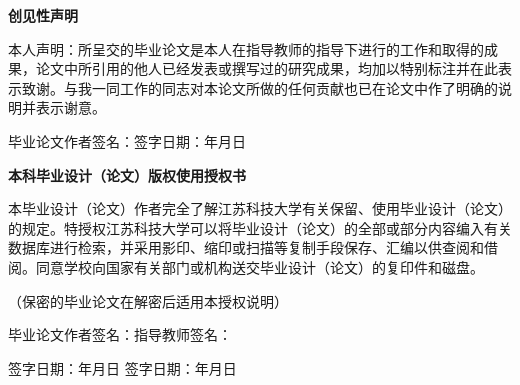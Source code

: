       \setlength{\headsep}{0.9cm}
    
             \begin{center}
                  \heiti
                  \bfseries
                  \setlength{\baselineskip}{18pt} %
                  创见性声明
              \end{center} %
             \vspace{0.2cm}
              \fangsong
              \setlength{\baselineskip}{28pt} %
    
              本人声明：所呈交的毕业论文是本人在指导教师的指导下进行的工作和取得的成果，论文中所引用的他人已经发表或撰写过的研究成果，均加以特别标注并在此表示致谢。与我一同工作的同志对本论文所做的任何贡献也已在论文中作了明确的说明并表示谢意。
    
              \vspace{3.8em}
    
              毕业论文作者签名：\quad\quad\quad 签字日期：\qquad\qquad 年\quad 月\quad 日
    
              \vspace{1.8em}
    
    
              \begin{center}
                  \heiti
                  \bfseries
                 \setlength{\baselineskip}{18pt} %
                  \qquad 本科毕业设计（论文）版权使用授权书
              \end{center} %
    
              \vspace{0.5em}
              {
              \fangsong
              \setlength{\baselineskip}{28pt} %
              本毕业设计（论文）作者完全了解江苏科技大学有关保留、使用毕业设计（论文）的规定。特授权江苏科技大学可以将毕业设计（论文）的全部或部分内容编入有关数据库进行检索，并采用影印、缩印或扫描等复制手段保存、汇编以供查阅和借阅。同意学校向国家有关部门或机构送交毕业设计（论文）的复印件和磁盘。
    
              （保密的毕业论文在解密后适用本授权说明）
    
              \vspace{1.8em}
    
              毕业论文作者签名：\quad\quad\quad\qquad 指导教师签名：
    
      \vspace{1.8em}
    
      签字日期：\qquad 年\quad 月\quad 日  \qquad  签字日期：\qquad 年\quad 月\quad 日
               }